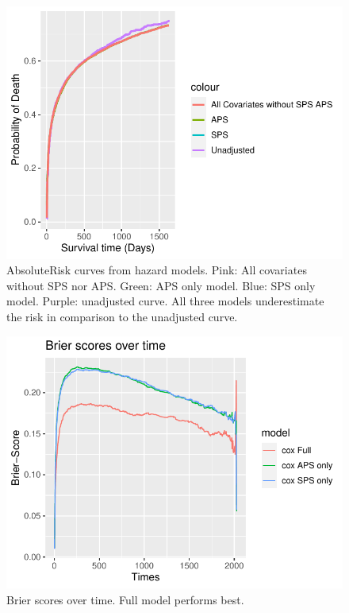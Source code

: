 \documentclass[
]{jss}
\begin{document}
\begin{CodeChunk}
\begin{figure}

{\centering \includegraphics{../figures/baselines-1} 

}

\caption{\label{fig:baselines} AbsoluteRisk curves from hazard models. Pink: All covariates without SPS nor APS. Green: APS only model. Blue: SPS only model. Purple: unadjusted curve. All three models underestimate the risk in comparison to the unadjusted curve.}\label{fig:baselines}
\end{figure}
\end{CodeChunk}

\begin{CodeChunk}
\begin{figure}

{\centering \includegraphics{../figures/brierpt1-1} 

}

\caption{\label{fig:brier1} Brier scores over time. Full model performs best.}\label{fig:brierpt1}
\end{figure}
\end{CodeChunk}
\end{document}
